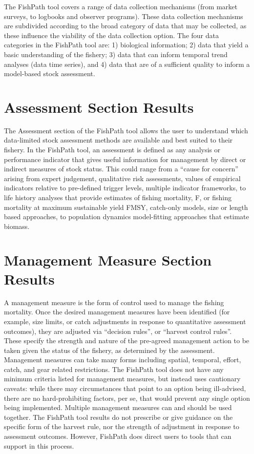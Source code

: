 \documentclass[11pt,]{book}
\begin{document}
The FishPath tool covers a range of data collection mechanisms (from market surveys, to logbooks and observer programs). These data collection mechanisms are subdivided according to the broad category of data that may be collected, as these influence the viability of the data collection option. The four data categories in the FishPath tool are: 1) biological information; 2) data that yield a basic understanding of the fishery; 3) data that can inform temporal trend analyses (data time series), and 4) data that are of a sufficient quality to inform a model-based stock assessment.

\hypertarget{assessment-section-results}{%
\section{Assessment Section Results}\label{assessment-section-results}}

The Assessment section of the FishPath tool allows the user to understand which data-limited stock assessment methods are available and best suited to their fishery. In the FishPath tool, an assessment is defined as any analysis or performance indicator that gives useful information for management by direct or indirect measures of stock status. This could range from a ``cause for concern'' arising from expert judgement, qualitative risk assessments, values of empirical indicators relative to pre-defined trigger levels, multiple indicator frameworks, to life history analyses that provide estimates of fishing mortality, F, or fishing mortality at maximum sustainable yield FMSY, catch-only models, size or length based approaches, to population dynamics model-fitting approaches that estimate biomass.

\hypertarget{management-measure-section-results}{%
\section{Management Measure Section Results}\label{management-measure-section-results}}

A management measure is the form of control used to manage the fishing mortality. Once the desired management measures have been identified (for example, size limits, or catch adjustments in response to quantitative assessment outcomes), they are adjusted via ``decision rules'', or ``harvest control rules''. These specify the strength and nature of the pre-agreed management action to be taken given the status of the fishery, as determined by the assessment. Management measures can take many forms including spatial, temporal, effort, catch, and gear related restrictions. The FishPath tool does not have any minimum criteria listed for management measures, but instead uses cautionary caveats: while there may circumstances that point to an option being ill-advised, there are no hard-prohibiting factors, per se, that would prevent any single option being implemented. Multiple management measures can and should be used together. The FishPath tool results do not prescribe or give guidance on the specific form of the harvest rule, nor the strength of adjustment in response to assessment outcomes. However, FishPath does direct users to tools that can support in this process.
\end{document}
